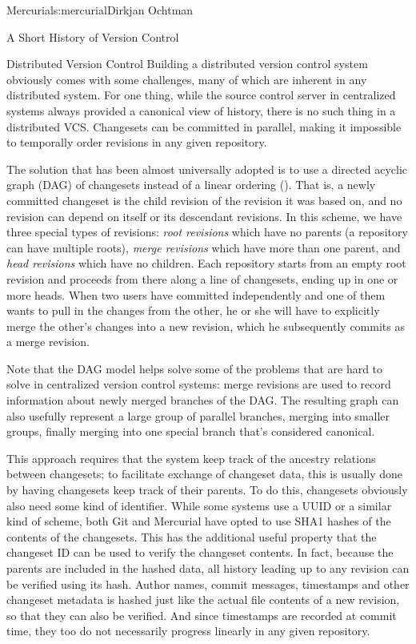 \begin{aosachapter}{Mercurial}{s:mercurial}{Dirkjan Ochtman}
\begin{aosasect1}{ A Short History of Version Control}
\begin{aosasect2}{Distributed Version Control}
Building a distributed version control system obviously comes with
some challenges, many of which are inherent in any distributed
system. For one thing, while the source control server in centralized
systems always provided a canonical view of history, there is no such
thing in a distributed VCS\@. Changesets can be committed in parallel,
making it impossible to temporally order revisions in any given
repository.

The solution that has been almost universally adopted is to use a
directed acyclic graph (DAG) of changesets instead of a linear
ordering (). That is, a newly committed
changeset is the child revision of the revision it was based on, and
no revision can depend on itself or its descendant revisions. In this
scheme, we have three special types of revisions: \emph{root
revisions} which have no parents (a repository can have multiple
roots), \emph{merge revisions} which have more than one parent, and
\emph{head revisions} which have no children. Each repository starts
from an empty root revision and proceeds from there along a line of
changesets, ending up in one or more heads. When two users have
committed independently and one of them wants to pull in the changes
from the other, he or she will have to explicitly merge the other's
changes into a new revision, which he subsequently commits as a merge
revision.


Note that the DAG model helps solve some of the problems that are hard
to solve in centralized version control systems: merge revisions are used to
record information about newly merged branches of the DAG. The
resulting graph can also usefully represent a large group of parallel
branches, merging into smaller groups, finally merging into one
special branch that's considered canonical.

This approach requires that the system keep track of the ancestry
relations between changesets; to facilitate exchange of changeset data,
this is usually done by having changesets keep track of their
parents. To do this, changesets obviously also need some kind of
identifier. While some systems use a UUID or a similar kind of scheme,
both Git and Mercurial have opted to use SHA1 hashes of the contents
of the changesets. This has the additional useful property that the
changeset ID can be used to verify the changeset contents. In fact,
because the parents are included in the hashed data, all history
leading up to any revision can be verified using its hash. Author
names, commit messages, timestamps and other changeset metadata is
hashed just like the actual file contents of a new revision, so that
they can also be verified. And since timestamps are recorded at commit
time, they too do not necessarily progress linearly in any given
repository.


\end{aosasect2}
\end{aosasect1}
\end{aosachapter}
